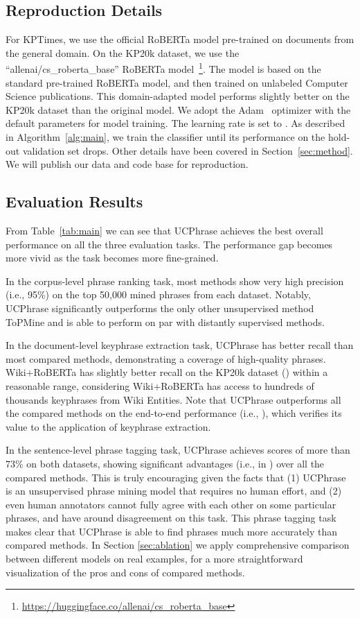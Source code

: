 \documentclass[sigconf]{acmart}
\newcommand{\our}{\mbox{UCPhrase}\xspace}
\newcommand{\myfootnote}[2]{\footnote{\scriptsize{#1} \href{#2}{\scriptsize{#2}}}}
\begin{document}
\subsection{Reproduction Details}
For KPTimes, we use the official RoBERTa model pre-trained on documents from the general domain. 
On the KP20k dataset, we use the ``allenai/cs\_roberta\_base'' RoBERTa model~\cite{gururangan2020don}\myfootnote{}{https://huggingface.co/allenai/cs\_roberta\_base}.
The model is based on the standard pre-trained RoBERTa model, and then trained on unlabeled Computer Science publications.
This domain-adapted model performs slightly better on the KP20k dataset than the original model.
We adopt the Adam~\cite{kingma2015adam} optimizer with the default parameters for model training.
The learning rate is set to .
As described in Algorithm~\ref{alg:main}, we train the classifier until its performance on the  hold-out validation set  drops.
Other details have been covered in Section~\ref{sec:method}.
We will publish our data and code base for reproduction.



\subsection{Evaluation Results}
From Table~\ref{tab:main} we can see that \our achieves the best overall performance on all the three evaluation tasks.
The performance gap becomes more vivid as the task becomes more fine-grained.

In the corpus-level phrase ranking task, most methods show very high precision (i.e.,  95\%) on the top 50,000 mined phrases from each dataset. 
Notably, \our significantly outperforms the only other unsupervised method ToPMine and is able to perform on par with distantly supervised methods.

In the document-level keyphrase extraction task, \our has better recall than most compared methods, demonstrating a coverage of high-quality phrases.
Wiki+RoBERTa has slightly better recall on the KP20k dataset () within a reasonable range, considering Wiki+RoBERTa has access to hundreds of thousands keyphrases from Wiki Entities.
Note that \our outperforms all the compared methods on the end-to-end performance (i.e., ), which verifies its value to the application of keyphrase extraction.

In the sentence-level phrase tagging task, \our achieves  scores of more than 73\% on both datasets, showing significant advantages (i.e.,  in ) over all the compared methods.
This is truly encouraging given the facts that (1) \our is an unsupervised phrase mining model that requires no human effort, and (2) even human annotators cannot fully agree with each other on some particular phrases, and have around  disagreement on this task. 
This phrase tagging task makes clear that \our is able to find phrases much more accurately than compared methods.
In Section \ref{sec:ablation} we apply comprehensive comparison between different models on real examples, for a more straightforward visualization of the pros and cons of compared methods.
\end{document}
